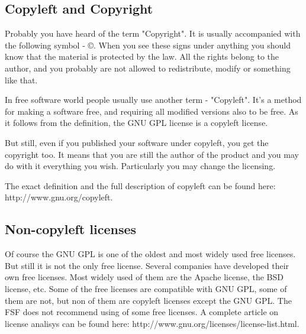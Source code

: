 \subsection{Copyleft and Copyright}
Probably you have heard of the term "Copyright". It is usually accompanied with the following symbol - \copyright. When you see these signs under anything you should know that the material is protected by the law. All the rights belong to the author, and you probably are not allowed to redistribute, modify or something like that.

In free software world people usually use another term - "Copyleft". It's a method for making a software free, and requiring all modified versions also to be free. As it follows from the definition, the GNU GPL license is a copyleft license. 

But still, even if you published your software under copyleft, you get the copyright too. It means that you are still the author of the product and you may do with it everything you wish. Particularly you may change the licensing.

The exact definition and the full description of copyleft can be found here: \\  http://www.gnu.org/copyleft.

\subsection{Non-copyleft licenses}

Of course the GNU GPL is one of the oldest and most widely used free licenses. But still it is not the only free license. Several companies have developed their own free licenses. Most widely used of them are the Apache license, the BSD license, etc. Some of the free licenses are compatible with GNU GPL, some of them are not, but non of them are copyleft licenses except the GNU GPL. The FSF does not recommend using of some free licenses. A complete article on license analisys can be found here: http://www.gnu.org/licenses/license-list.html.


